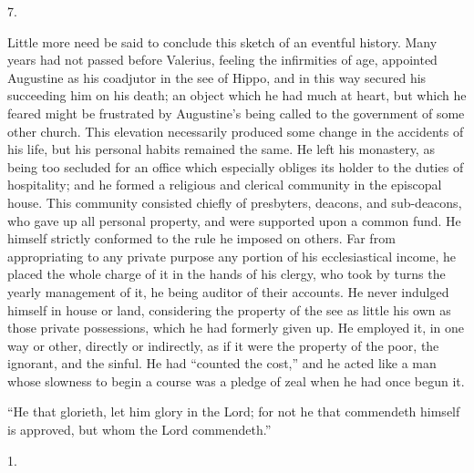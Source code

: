 7.

Little more need be said to conclude this sketch of an eventful
history. Many years had not passed before Valerius, feeling the
infirmities of age, appointed Augustine as his coadjutor in the see of
Hippo, and in this way secured his succeeding him on his death; an
object which he had much at heart, but which he feared might be
frustrated by Augustine's being called to the government of some other
church. This elevation necessarily produced some change in the
accidents of his life, but his personal habits remained the same. He
left his monastery, as being too secluded for an office which
especially obliges its holder to the duties of hospitality; and he
formed a religious and clerical community in the episcopal house. This community consisted chiefly of presbyters, deacons, and
sub-deacons, who gave up all personal property, and were supported
upon a common fund. He himself strictly conformed to the rule he
imposed on others. Far from appropriating to any private purpose any
portion of his ecclesiastical income, he placed the whole charge of it
in the hands of his clergy, who took by turns the yearly management of
it, he being auditor of their accounts. He never indulged himself in
house or land, considering the property of the see as little his own
as those private possessions, which he had formerly given up. He
employed it, in one way or other, directly or indirectly, as if it
were the property of the poor, the ignorant, and the sinful. He had
``counted the cost,'' and he acted like a man whose slowness
to begin a course was a pledge of zeal when he had once begun it.


``He that glorieth, let him glory in the Lord; for not he
that commendeth himself is approved, but whom the Lord commendeth.''

1.

